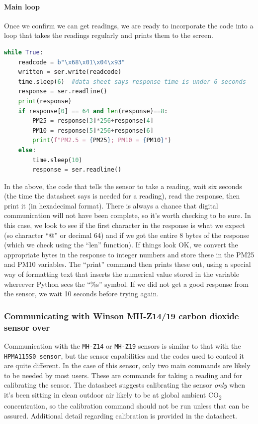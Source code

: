 \paragraph{Main loop}
Once we confirm we can get readings, we are ready to incorporate the code into a loop that takes the readings regularly and prints them to the screen.

\begin{lstlisting}[language=Python]
while True:
	readcode = b"\x68\x01\x04\x93"
	written = ser.write(readcode) 
	time.sleep(6)  #data sheet says response time is under 6 seconds
	response = ser.readline()
	print(response)
	if response[0] == 64 and len(response)==8:
		PM25 = response[3]*256+response[4]
		PM10 = response[5]*256+response[6]
		print(f"PM2.5 = {PM25}; PM10 = {PM10}")
	else:
		time.sleep(10)
		response = ser.readline()

\end{lstlisting}

In the above, the code that tells the sensor to take a reading, wait six seconds (the time the datasheet says is needed for a reading), read the response, then print it (in hexadecimal format).
There is always a chance that digital communication will not have been complete, so it's worth checking to be sure.
In this case, we look to see if the first character in the response is what we expect (so character “@” or decimal 64) and if we got the entire 8 bytes of the response (which we check using the “len” function).
If things look OK, we convert the appropriate bytes in the response to integer numbers and store these in the PM25 and PM10 variables.
The “print” command then prints these out, using a special way of formatting text that inserts the numerical value stored in the variable whereever Python sees the “\%s” symbol.
If we did not get a good response from the sensor, we wait 10 seconds before trying again.

\subsubsection{Communicating with Winson MH-Z14/19 carbon dioxide sensor over \uart}

Communication with the \texttt{MH-Z14} or \texttt{MH-Z19} sensors is similar to that with the \texttt{HPMA115S0 sensor}, but the sensor capabilities and the codes used to control it are quite different.
In the case of this sensor, only two main commands are likely to be needed by most users.
These are commands for taking a reading and for calibrating the sensor.
The datasheet suggests calibrating the sensor \emph{only} when it's been sitting in clean outdoor air likely to be at global ambient CO\textsubscript{2} concentration, so the calibration command should not be run unless that can be assured.
Additional detail regarding calibration is provided in the datasheet.


